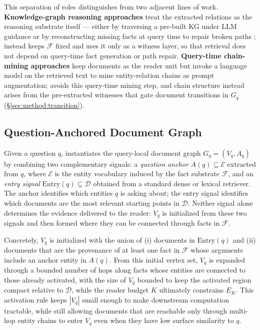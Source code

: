This separation of roles distinguishes \methodname{} from two adjacent
lines of work. \textbf{Knowledge-graph reasoning approaches}
\citep{sun2024tog,huang2026relink} treat the extracted relations as the
reasoning substrate itself --- either by traversing a pre-built KG under
LLM guidance \citep{sun2024tog} or by reconstructing missing facts at query
time to repair broken paths \citep{huang2026relink}; \methodname{} instead
keeps $\mathcal{F}$ fixed and uses it only as a witness layer, so that
retrieval does not depend on query-time fact generation or path repair.
\textbf{Query-time chain-mining approaches} \citep{peng2026neocorrag} keep
documents as the reader unit but invoke a language model on the retrieved
text to mine entity-relation chains as prompt augmentation; \methodname{}
avoids this query-time mining step, and chain structure instead arises
from the pre-extracted witnesses that gate document transitions in $G_q$
(\S\ref{sec:method:transition}).

\subsection{Question-Anchored Document Graph}
\label{sec:method:anchor}

Given a question $q$, \methodname{} instantiates the query-local document
graph $G_q = (V_q, A_q)$ by combining two complementary signals: a
\emph{question anchor} $A(q) \subseteq \mathcal{E}$ extracted from $q$,
where $\mathcal{E}$ is the entity vocabulary induced by the fact substrate
$\mathcal{F}$, and an \emph{entry signal} $\mathrm{Entry}(q) \subseteq
\mathcal{D}$ obtained from a standard dense or lexical retriever. The
anchor identifies which entities $q$ is asking about; the entry signal
identifies which documents are the most relevant starting points in
$\mathcal{D}$. Neither signal alone determines the evidence delivered to
the reader: $V_q$ is initialized from these two signals and then formed
where they can be connected through facts in $\mathcal{F}$.

Concretely, $V_q$ is initialized with the union of (i) documents in
$\mathrm{Entry}(q)$ and (ii) documents that are the provenance of at least
one fact in $\mathcal{F}$ whose arguments include an anchor entity in
$A(q)$. From this initial vertex set, $V_q$ is expanded through a bounded
number of hops along facts whose entities are connected to those already
activated, with the size of $V_q$ bounded to keep the activated region
compact relative to $\mathcal{D}$, while the reader budget $K$ ultimately
constrains $E_K$. This activation rule keeps $|V_q|$ small enough to make
downstream computation tractable, while still allowing documents that
are reachable only through multi-hop entity chains to enter $V_q$ even
when they have low surface similarity to $q$.


